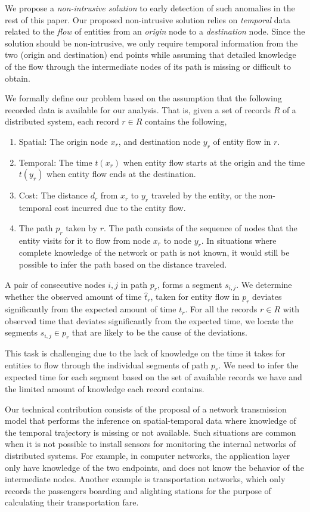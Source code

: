 \documentclass[conference]{IEEEtran.1.8}
\begin{document}
We propose a \emph{non-intrusive solution} to early detection of such anomalies in the rest of this paper. Our proposed non-intrusive solution relies on \emph{temporal} data related to the \emph{flow} of entities from an \emph{origin} node to a \emph{destination} node. Since the solution should be non-intrusive, we only require temporal information from the two (origin and destination) end points while assuming that detailed knowledge of the flow through the intermediate nodes of its path is missing or difficult to obtain.

We formally define our problem based on the assumption that the following recorded data is available for our analysis. That is, given a set of records $R$ of a distributed system, each record $r \in R$ contains the following,
\begin{enumerate}
	\item Spatial: The origin node $x_r$, and destination node $y_r$ of entity flow in $r$.
	\item Temporal: The time $t(x_r)$ when entity flow starts at the origin and the time $t(y_r)$ when entity flow ends at the destination.
	\item Cost: The distance $d_r$ from $x_r$ to $y_r$ traveled by the entity, or the non-temporal cost incurred due to the entity flow.
	\item The path $p_r$ taken by $r$. The path consists of the sequence of nodes that the entity visits for it to flow from node $x_r$ to node $y_r$. In situations where complete knowledge of the network or path is not known, it would still be possible to infer the path based on the distance traveled.
\end{enumerate}
A pair of consecutive nodes $i,j$ in path $p_r$, forms a segment $s_{i,j}$. We determine whether the observed amount of time $\hat{t}_r$, taken for entity flow in $p_r$ deviates significantly from the expected amount of time $t_r$. For all the records $r \in R$ with observed time that deviates significantly from the expected time, we locate the segments $s_{i,j} \in p_r$ that are likely to be the cause of the deviations. 

This task is challenging due to the lack of knowledge on the time it takes for entities to flow through the individual segments of path $p_r$. We need to infer the expected time for each segment based on the set of available records we have and the limited amount of knowledge each record contains.

Our technical contribution consists of the proposal of a network transmission model that performs the inference on spatial-temporal data where knowledge of the temporal trajectory is missing or not available. Such situations are common when it is not possible to install sensors for monitoring the internal networks of distributed systems. For example, in computer networks, the application layer only have knowledge of the two endpoints, and does not know the behavior of the intermediate nodes. Another example is transportation networks, which only records the passengers boarding and alighting stations for the purpose of calculating their transportation fare. 
\end{document}
